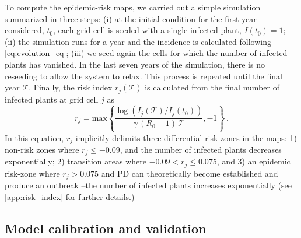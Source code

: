 To compute the epidemic-risk maps, we carried out a simple simulation
summarized in three steps: (i) at the initial condition for the first year
considered, $t_0$, each grid cell is seeded with a single infected plant,
$I(t_0)=1$; (ii) the simulation runs for a year and the incidence is calculated
following \cref{eq:evolution_eq}; (iii) we seed again the cells for which
the
number of infected plants has vanished. In the last seven years of the
simulation, there is no reseeding to allow the system to relax. This
process is
repeated until the final year $\mathcal{T}$. Finally, the risk index
$r_j(\mathcal{T})$ is calculated from the final number of infected plants at
grid cell $j$ as
\begin{equation}
    r_j=\textrm{max}\left\{\frac{
        \log(I_j(\mathcal{T})/I_j(t_0))}{\gamma\,
        (R_0-1)\, \mathcal{T}}, -1 \right\} \ .
    \label{eq:riskmeasure}
\end{equation}
In this equation, $r_j$ implicitly delimits three differential risk zones
in the maps: 1) non-risk zones where $r_j \le -0.09$, and the number of
infected plants decreases exponentially; 2) transition areas where $-0.09 <
    r_j
    \le 0.075 $, and 3) an epidemic risk-zone where $ r_j >0.075$ and PD can
theoretically become established and produce an outbreak --the number of
infected plants increases exponentially (see \cref{app:risk_index} for
further details.)

\subsection{Model calibration and validation}

